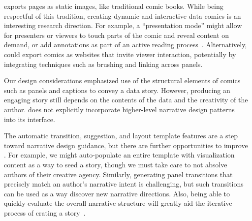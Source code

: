 \vspace{2mm}
\toolname{} exports pages as static images, like traditional comic books. While being respectful of this tradition, creating dynamic and interactive data comics is an interesting research direction. For example, a ``presentation mode'' might allow for presenters or viewers to touch parts of the comic and reveal content on demand, or add annotations as part of an active reading process~\cite{walny2018active}. Alternatively, \toolname{} could export comics as websites that invite viewer interaction, potentially by integrating techniques such as brushing and linking across panels.

\vspace{2mm}
 Our design considerations emphasized use of the structural elements of comics such as panels and captions to convey a data story. However, producing an engaging story still depends on the contents of the data and the creativity of the author. \toolname{} does not explicitly incorporate higher-level narrative design patterns~\cite{bachdesign,bach2018napa} into its interface. 

The automatic transition, suggestion, and layout template features are a step toward narrative design guidance, but there are further opportunities to improve
. For example, we might auto-populate an entire template with visualization content as a way to seed a story, though we must take care to not absolve authors of their creative agency. Similarly, generating panel transitions that precisely match an author's narrative intent is challenging, but such transitions can be used as a way discover new narrative directions. Also, being able to quickly evaluate the overall narrative structure will greatly aid the iterative process of crating a story~\cite{storycurve}.



